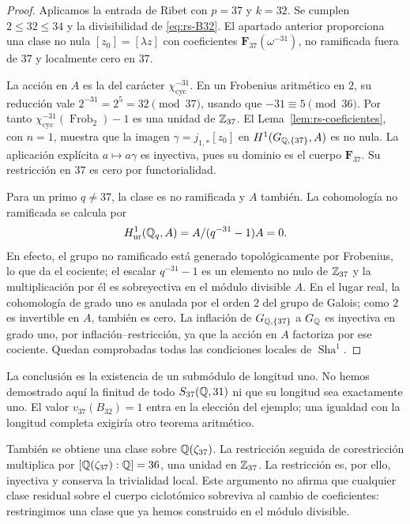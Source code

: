 \begin{proof}
Aplicamos la entrada de Ribet con $p=37$ y $k=32$.
Se cumplen $2\le32\le34$ y la divisibilidad de
\eqref{eq:rs-B32}. El apartado anterior proporciona una clase no
nula $[z_0]=[\lambda z]$ con coeficientes
$\mathbf F_{37}(\omega^{-31})$, no ramificada fuera de $37$
y localmente cero en $37$.

La acción en $A$ es la del carácter
$\chi_{\mathrm{cyc}}^{-31}$. En un Frobenius aritmético en $2$,
su reducción vale
$2^{-31}=2^5=32\pmod{37}$, usando que
$-31\equiv5\pmod{36}$. Por tanto
$\chi_{\mathrm{cyc}}^{-31}(\operatorname{Frob}_2)-1$ es una
unidad de $\mathbb{Z}_{37}$. El Lema~\ref{lem:rs-coeficientes}, con $n=1$,
muestra que la imagen
$\gamma=j_{1,*}[z_0]$ en $H^1(G_{\mathbb{Q},\{37\}},A)$ es no nula.
La aplicación explícita $a\mapsto a\gamma$ es inyectiva,
pues su dominio es el cuerpo $\mathbf F_{37}$. Su restricción
en $37$ es cero por functorialidad.

Para un primo $q\ne37$, la clase es no ramificada y $A$ también.
La cohomología no ramificada se calcula por
\begin{equation}
 H^1_{\mathrm{ur}}(\mathbb{Q}_q,A)
       =A/(q^{-31}-1)A=0.
 \label{eq:rs-local-q}
\end{equation}
En efecto, el grupo no ramificado está generado topológicamente
por Frobenius, lo que da el cociente; el escalar
$q^{-31}-1$ es un elemento no nulo de $\mathbb{Z}_{37}$ y la
multiplicación por él es sobreyectiva en el módulo divisible $A$.
En el lugar real, la cohomología de grado uno es anulada por el
orden $2$ del grupo de Galois; como $2$ es invertible en $A$,
también es cero. La inflación de $G_{\mathbb{Q},\{37\}}$ a $G_{\mathbb{Q}}$ es
inyectiva en grado uno, por inflación--restricción, ya que la
acción en $A$ factoriza por ese cociente. Quedan comprobadas
todas las condiciones locales de $\operatorname{Sha}^1$.
\end{proof}

La conclusión es la existencia de un submódulo de longitud uno.
No hemos demostrado aquí la finitud de todo $S_{37}(\mathbb{Q},31)$ ni
que su longitud sea exactamente uno. El valor
$v_{37}(B_{32})=1$ entra en la elección del ejemplo; una igualdad
con la longitud completa exigiría otro teorema aritmético.

También se obtiene una clase sobre $\mathbb{Q}(\zeta_{37})$.
La restricción seguida de corestricción multiplica por
$[\mathbb{Q}(\zeta_{37}):\mathbb{Q}]=36$, una unidad en $\mathbb{Z}_{37}$.
La restricción es, por ello, inyectiva y conserva la trivialidad
local. Este argumento no afirma que cualquier clase residual
sobre el cuerpo ciclotómico sobreviva al cambio de coeficientes:
restringimos una clase que ya hemos construido en el módulo
divisible.

